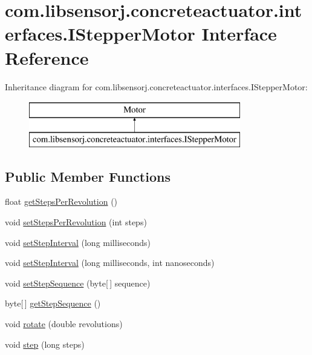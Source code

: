 \hypertarget{interfacecom_1_1libsensorj_1_1concreteactuator_1_1interfaces_1_1IStepperMotor}{}\section{com.\+libsensorj.\+concreteactuator.\+interfaces.\+I\+Stepper\+Motor Interface Reference}
\label{interfacecom_1_1libsensorj_1_1concreteactuator_1_1interfaces_1_1IStepperMotor}
Inheritance diagram for com.\+libsensorj.\+concreteactuator.\+interfaces.\+I\+Stepper\+Motor\+:\begin{figure}[H]
\begin{center}
\leavevmode
\includegraphics[height=2.000000cm]{interfacecom_1_1libsensorj_1_1concreteactuator_1_1interfaces_1_1IStepperMotor}
\end{center}
\end{figure}
\subsection*{Public Member Functions}
\begin{DoxyCompactItemize}
\item 
float \hyperlink{interfacecom_1_1libsensorj_1_1concreteactuator_1_1interfaces_1_1IStepperMotor_afc7fc6ed71c0098df44dc97d051bba74}{get\+Steps\+Per\+Revolution} ()
\item 
void \hyperlink{interfacecom_1_1libsensorj_1_1concreteactuator_1_1interfaces_1_1IStepperMotor_a5c136c6767e43b652286468529c66e58}{set\+Steps\+Per\+Revolution} (int steps)
\item 
void \hyperlink{interfacecom_1_1libsensorj_1_1concreteactuator_1_1interfaces_1_1IStepperMotor_a4894a4c5917bfa66db31b3cb0342ad25}{set\+Step\+Interval} (long milliseconds)
\item 
void \hyperlink{interfacecom_1_1libsensorj_1_1concreteactuator_1_1interfaces_1_1IStepperMotor_a0772dc757e0281f612de513066515296}{set\+Step\+Interval} (long milliseconds, int nanoseconds)
\item 
void \hyperlink{interfacecom_1_1libsensorj_1_1concreteactuator_1_1interfaces_1_1IStepperMotor_ae771f40d126e2251f4043b11340be57b}{set\+Step\+Sequence} (byte\mbox{[}$\,$\mbox{]} sequence)
\item 
byte\mbox{[}$\,$\mbox{]} \hyperlink{interfacecom_1_1libsensorj_1_1concreteactuator_1_1interfaces_1_1IStepperMotor_a878ca81b5a32fbed1a52e9605b61818a}{get\+Step\+Sequence} ()
\item 
void \hyperlink{interfacecom_1_1libsensorj_1_1concreteactuator_1_1interfaces_1_1IStepperMotor_ae3f5dbdba759ed2efe4d5195f9aae2a1}{rotate} (double revolutions)
\item 
void \hyperlink{interfacecom_1_1libsensorj_1_1concreteactuator_1_1interfaces_1_1IStepperMotor_af93fff3068238b5222df10d50e2983ac}{step} (long steps)
\end{DoxyCompactItemize}


